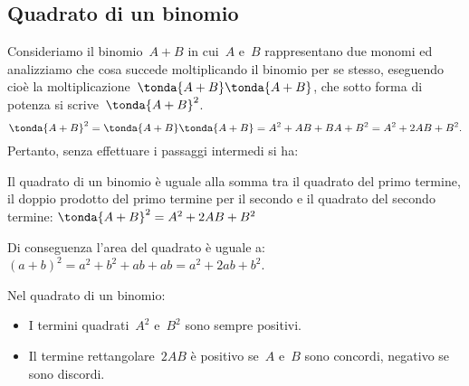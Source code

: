 \subsection{Quadrato di un binomio}
\label{subsec:prodnot_quadratobinomio}

Consideriamo il binomio~\(A+B\) in cui~\(A\) e~\(B\) rappresentano due 
monomi ed analizziamo che cosa succede moltiplicando il binomio per se
stesso, eseguendo cioè la
moltiplicazione~\(\tonda{A+B}\tonda{A+B}\), che sotto forma di 
potenza si scrive~\(\tonda{A+B}^{2}\).
\[\tonda{A+B}^{2}=\tonda{A+B}\tonda{A+B}=A^{2}+{AB}+{BA}+B^{2
}=A^{2}+2{AB}+B^{2}.\]
Pertanto, senza effettuare i passaggi intermedi si ha:

\begin{teorema}{}{} 
Il quadrato di un binomio è
uguale alla somma tra il quadrato del primo termine, il doppio prodotto 
del primo termine per il secondo e il quadrato del secondo termine: \quad 
\(\tonda{A+B}^{2}=A^{2}+2{AB}+B^{2}\)
\end{teorema}


Di conseguenza l'area del quadrato è uguale 
a:~\((a+b)^{2}=a^{2}+b^{2}+{ab}+{ab}=a^{2}+2{ab}+b^{2}\).

\begin{osservazione}{}{} 
Nel quadrato di un binomio:
\begin{itemize} [nosep]
\item I termini quadrati~\(A^{2}\) e~\(B^{2}\) sono sempre positivi.
\item Il termine rettangolare~\(2AB\) è positivo se~\(A\) e~\(B\) sono 
concordi, negativo se sono discordi.
\end{itemize}
\end{osservazione}

% 
% 

